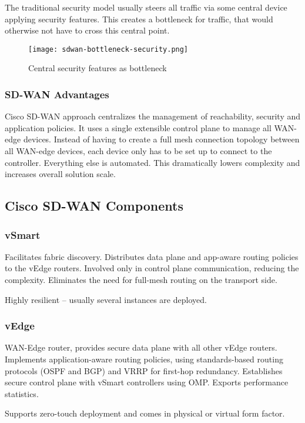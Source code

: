 The traditional security model usually steers all traffic via some central device applying security features.
This creates a bottleneck for traffic, that would otherwise not have to cross this central point. 

\begin{figure}[h]
    \texttt{[image: sdwan-bottleneck-security.png]}
    \caption{Central security features as bottleneck}
\end{figure}

\subsubsection{SD-WAN Advantages}
Cisco SD-WAN approach centralizes the management of reachability, security and application policies.
It uses a single extensible control plane to manage all WAN-edge devices. Instead of having to create a full mesh 
connection topology between all WAN-edge devices, each device only has to be set up to connect to the controller.
Everything else is automated. This dramatically lowers complexity and increases overall solution scale.

\subsection{Cisco SD-WAN Components}

\subsubsection{vSmart}
Facilitates fabric discovery. Distributes data plane and app-aware routing policies to the vEdge routers. 
Involved only in control plane communication, reducing the complexity. 
Eliminates the need for full-mesh routing on the transport side.

Highly resilient -- usually several instances are deployed.  

\subsubsection{vEdge}
WAN-Edge router, provides secure data plane with all other vEdge routers.
Implements application-aware routing policies, using standards-based routing protocols (OSPF and BGP)
 and VRRP for first-hop redundancy.
Establishes secure control plane with vSmart controllers using OMP.
Exports performance statistics.

Supports zero-touch deployment and comes in physical or virtual form factor.

